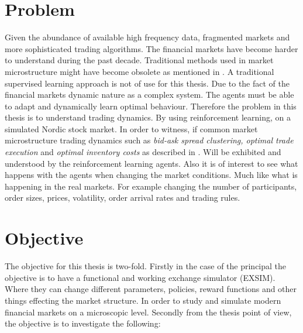 \documentclass{kththesis}
\theoremstyle{definition}
\begin{document}

\section{Problem}
 Given the abundance of available high frequency data, fragmented markets and more sophisticated trading algorithms. The financial markets have become harder to understand during the past decade. Traditional methods used in market microstructure might have become obsolete as mentioned in \textcite{o2015high}. A traditional supervised learning approach is not of use for this thesis. Due to the fact of the financial markets dynamic nature as a complex system. The agents must be able to adapt and dynamically learn optimal behaviour.  Therefore the problem in this thesis is to understand trading dynamics. By using reinforcement learning, on a simulated Nordic stock market. 
\newline
\newline
In order to witness, if common market microstructure trading dynamics such as \textit{bid-ask spread clustering, optimal trade execution} and \textit{optimal inventory costs} as described in \textcite{o1995market}. Will be exhibited and understood by the reinforcement learning agents. Also it is of interest to see what happens with the agents when changing the market conditions. Much like what is happening in the real markets. For example changing the number of participants, order sizes, prices, volatility, order arrival rates and trading rules.



\section{Objective}
The objective for this thesis is two-fold. Firstly in the case of the principal the objective is to have a functional and working exchange simulator (EXSIM). Where they can change different parameters, policies, reward functions and other things effecting the market structure. In order to study and simulate modern financial markets on a microscopic level. Secondly from the thesis point of view, the objective is to investigate the following:
\end{document}
